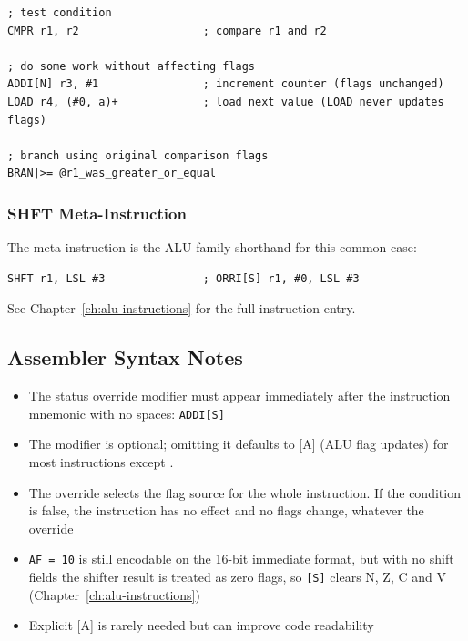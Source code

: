 \begin{lstlisting}
; test condition
CMPR r1, r2                   ; compare r1 and r2

; do some work without affecting flags
ADDI[N] r3, #1                ; increment counter (flags unchanged)
LOAD r4, (#0, a)+             ; load next value (LOAD never updates flags)

; branch using original comparison flags
BRAN|>= @r1_was_greater_or_equal
\end{lstlisting}

\subsubsection{SHFT Meta-Instruction}

The  meta-instruction is the ALU-family shorthand for this common case:

\begin{lstlisting}
SHFT r1, LSL #3               ; ORRI[S] r1, #0, LSL #3
\end{lstlisting}

See Chapter~\ref{ch:alu-instructions} for the full  instruction entry.

\subsection{Assembler Syntax Notes}

\begin{itemize}
	\item The status override modifier must appear immediately after the instruction mnemonic with no spaces: \texttt{ADDI[S]}
	\item The modifier is optional; omitting it defaults to {[}A{]} (ALU flag updates) for most instructions except
	      .
	\item The override selects the flag source for the whole instruction. If the condition is false, the instruction has no
	      effect and no flags change, whatever the override
	\item \texttt{AF = 10} is still encodable on the 16-bit immediate format, but with no shift fields the shifter result is treated as zero flags, so \texttt{[S]} clears N, Z, C and V (Chapter~\ref{ch:alu-instructions})
	\item Explicit {[}A{]} is rarely needed but can improve code readability
\end{itemize}
